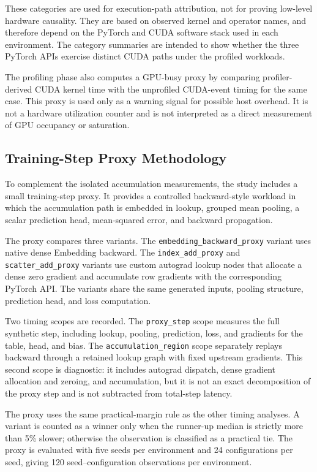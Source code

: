These categories are used for execution-path attribution, not for proving low-level hardware causality. They are based on observed kernel and operator names, and therefore depend on the PyTorch and CUDA software stack used in each environment. The category summaries are intended to show whether the three PyTorch APIs exercise distinct CUDA paths under the profiled workloads.

The profiling phase also computes a GPU-busy proxy by comparing profiler-derived CUDA kernel time with the unprofiled CUDA-event timing for the same case. This proxy is used only as a warning signal for possible host overhead. It is not a hardware utilization counter and is not interpreted as a direct measurement of GPU occupancy or saturation.

\subsection{Training-Step Proxy Methodology}

To complement the isolated accumulation measurements, the study includes a small training-step proxy. It provides a controlled backward-style workload in which the accumulation path is embedded in lookup, grouped mean pooling, a scalar prediction head, mean-squared error, and backward propagation.

The proxy compares three variants. The \texttt{embedding\_\allowbreak backward\_\allowbreak proxy} variant uses native dense Embedding backward. The \texttt{index\_\allowbreak add\_\allowbreak proxy} and \texttt{scatter\_\allowbreak add\_\allowbreak proxy} variants use custom autograd lookup nodes that allocate a dense zero gradient and accumulate row gradients with the corresponding PyTorch API. The variants share the same generated inputs, pooling structure, prediction head, and loss computation.

Two timing scopes are recorded. The \texttt{proxy\_\allowbreak step} scope measures the full synthetic step, including lookup, pooling, prediction, loss, and gradients for the table, head, and bias. The \texttt{accumulation\_\allowbreak region} scope separately replays backward through a retained lookup graph with fixed upstream gradients. This second scope is diagnostic: it includes autograd dispatch, dense gradient allocation and zeroing, and accumulation, but it is not an exact decomposition of the proxy step and is not subtracted from total-step latency.

The proxy uses the same practical-margin rule as the other timing analyses. A variant is counted as a winner only when the runner-up median is strictly more than 5\% slower; otherwise the observation is classified as a practical tie. The proxy is evaluated with five seeds per environment and 24 configurations per seed, giving 120 seed--configuration observations per environment.

